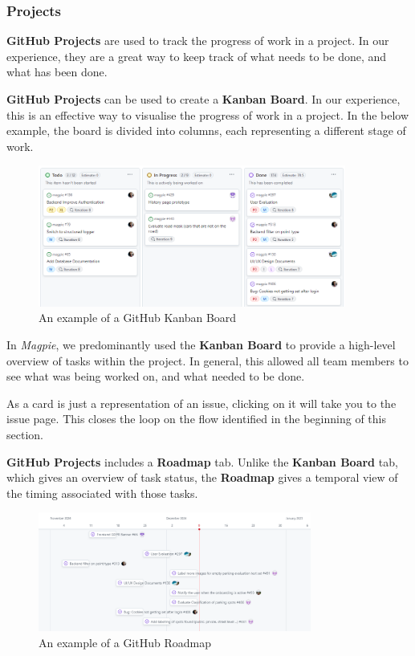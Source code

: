 \newpage{}

\subsubsection{Projects}
\textbf{GitHub Projects} are used to track the progress of work in a project. In
our experience, they are a great way to keep track of what needs to be done, and
what has been done.

\textbf{GitHub Projects} can be used to create a \textbf{Kanban Board}. In our
experience, this is an effective way to visualise the progress of work in a project.
In the below example, the board is divided into columns, each representing a
different stage of work.

\begin{figure}[htbp]
    \centering{}
    \includegraphics[width=0.9\textwidth]{images/github_kanban.png}
    \caption{An example of a GitHub Kanban Board}
\end{figure}

In \textit{Magpie}, we predominantly used the \textbf{Kanban Board} to provide a
high-level overview of tasks within the project. In general, this allowed all
team members to see what was being worked on, and what needed to be done.

As a card is just a representation of an issue, clicking on it will take you to
the issue page. This closes the loop on the flow identified in the beginning of
this section.

\textbf{GitHub Projects} includes a \textbf{Roadmap} tab. Unlike the
\textbf{Kanban Board} tab, which gives an overview of task status, the
\textbf{Roadmap} gives a temporal view of the timing associated with those
tasks.

\begin{figure}[h]
    \centering{}
    \includegraphics[width=0.8\textwidth]{images/github_roadmap.png}
    \caption{An example of a GitHub Roadmap}
\end{figure}

